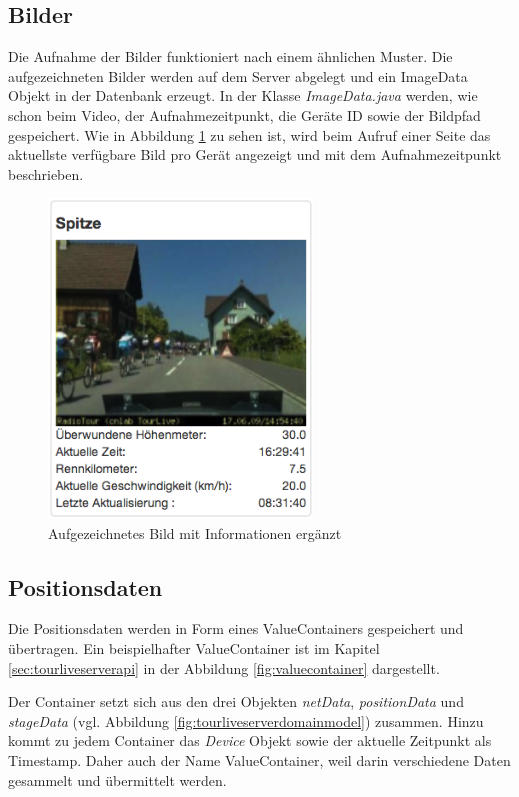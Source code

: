 \subsection{Bilder}
Die Aufnahme der Bilder funktioniert nach einem ähnlichen Muster. Die aufgezeichneten Bilder werden auf dem Server abgelegt und ein ImageData Objekt in der Datenbank erzeugt. In der Klasse \textit{ImageData.java} werden, wie schon beim Video, der Aufnahmezeitpunkt, die Geräte ID sowie der Bildpfad gespeichert. Wie in Abbildung \ref{fig:bildaufzeichnung} zu sehen ist, wird beim Aufruf einer Seite das aktuellste verfügbare Bild pro Gerät angezeigt und mit dem Aufnahmezeitpunkt beschrieben.
\begin{figure}[H]
	\centering
	\includegraphics[width=70mm]{images/tourliveweb/bildaufzeichnung.png}
	\caption{Aufgezeichnetes Bild mit Informationen ergänzt}
	\label{fig:bildaufzeichnung}
\end{figure}

\subsection{Positionsdaten}
Die Positionsdaten werden in Form eines ValueContainers gespeichert und übertragen. Ein beispielhafter ValueContainer ist im Kapitel \ref{sec:tourliveserverapi} in der Abbildung \ref{fig:valuecontainer} dargestellt.

Der Container setzt sich aus den drei Objekten \textit{netData}, \textit{positionData} und \textit{stageData} (vgl. Abbildung \ref{fig:tourliveserverdomainmodel}) zusammen. Hinzu kommt zu jedem Container das \textit{Device} Objekt sowie der aktuelle Zeitpunkt als Timestamp. Daher auch der Name ValueContainer, weil darin verschiedene Daten gesammelt und übermittelt werden.
\\

